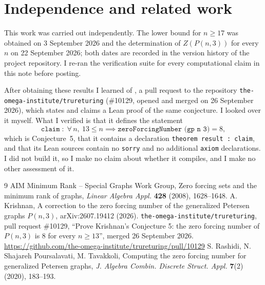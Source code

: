 \documentclass[11pt]{article}
\theoremstyle{definition}
\begin{document}
\section*{Independence and related work}

This work was carried out independently. The lower bound for $n\ge17$ was
obtained on 3 September 2026 and the determination of $Z(P(n,3))$ for every $n$
on 22 September 2026; both dates are recorded in the version history of the
project repository. I re-ran the verification suite for every computational
claim in this note before posting.

After obtaining these results I learned of \cite{lean}, a pull request to the
repository \texttt{the-omega-institute/trureturing} (\#10129, opened and merged
on 26 September 2026), which states and claims a Lean proof of the same
conjecture. I looked over it myself. What I verified is that it defines the
statement
\[
  \texttt{claim} \;:\; \forall\, n,\ 13\le n \implies
  \texttt{zeroForcingNumber (gp n 3)} = 8,
\]
which is Conjecture~5, that it contains a declaration \texttt{theorem result :
claim}, and that its Lean sources contain no \texttt{sorry} and no additional
\texttt{axiom} declarations. I did not build it, so I make no claim about
whether it compiles, and I make no other assessment of it.

\begin{thebibliography}{9}
 AIM Minimum Rank -- Special Graphs Work Group, Zero forcing sets
  and the minimum rank of graphs, \emph{Linear Algebra Appl.} \textbf{428}
  (2008), 1628--1648.
 A. Krishnan, A correction to the zero forcing number of the
  generalized Petersen graphs $P(n,3)$, arXiv:2607.19412 (2026).
 \texttt{the-omega-institute/trureturing}, pull request \#10129,
  ``Prove Krishnan's Conjecture 5: the zero forcing number of $P(n,3)$ is 8 for
  every $n\ge13$'', merged 26 September 2026.
  \url{https://github.com/the-omega-institute/trureturing/pull/10129}
 S. Rashidi, N. Shajareh Poursalavati, M. Tavakkoli, Computing the
  zero forcing number for generalized Petersen graphs, \emph{J. Algebra Combin.
  Discrete Struct. Appl.} \textbf{7}(2) (2020), 183--193.
\end{thebibliography}
\end{document}
